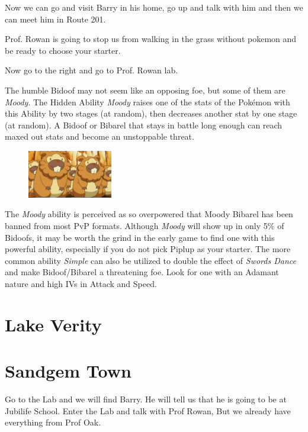 \documentclass[11pt]{article}
\begin{document}
Now we can go and visit Barry in his home, go up and talk with him
and then we can meet him in Route 201.

Prof. Rowan is going to stop us from walking in the grass without pokemon
and be ready to choose your starter.

Now go to the right and go to Prof. Rowan lab.



\begin{mdframed}[style=MyFrame,nobreak=true,frametitle={Pokemon Spotlight: Bidoof}]

The humble Bidoof may not seem like an opposing foe, but some of them are \emph{Moody}.
The Hidden Ability \emph{Moody} raises one of the stats of the Pokémon with this
Ability by two stages (at random), then decreases another stat by one stage (at random).
A Bidoof or Bibarel that stays in battle long enough can reach maxed out stats
and become an unstoppable threat.

\begin{figure}
\includegraphics[width=0.33\textwidth]{walkthrough/Sinnoh/spotlight-bidoof}
\label{fig:spotlight-bidoof}
\end{figure}

The \emph{Moody} ability is perceived as so overpowered that Moody Bibarel has been
banned from most PvP formats.
Although \emph{Moody} will show up in only 5\% of Bidoofs, it may be worth the
grind in the early game to find one with this powerful ability, especially if
you do not pick Piplup as your starter.
The more common ability \emph{Simple} can also be utilized to double the effect of
\emph{Swords Dance} and make Bidoof/Bibarel a threatening foe.
Look for one with an Adamant nature and high IVs in Attack and Speed.

\end{mdframed}

\section{Lake Verity}\label{sec:Lake_Verity}


\section{Sandgem Town}\label{sec:sandgem-town}
Go to the Lab and we will find Barry. He will tell us that he is going to be at Jubilife School.
Enter the Lab and talk with Prof Rowan, But we already have everything from Prof Oak.
\end{document}
